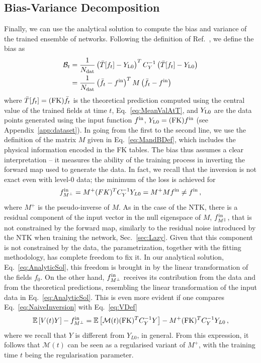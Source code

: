 \subsection{Bias-Variance Decomposition}
\label{sec:BiasVarNumerical}
Finally, we can use the analytical solution to compute the bias and variance of
the trained ensemble of networks. Following the definition of
Ref.~\cite{NNPDF:2021njg}, we define the bias as
\begin{align}
  \mathcal{B}_t 
  &= \frac{1}{N_{\rm dat}} \left( \bar{T}[f_t] - Y_{\rm L0} \right)^T C_Y^{-1} \left( \bar{T}[f_t] - Y_{\rm L0} \right) \\
  &= \frac{1}{N_{\rm dat}} \left( \bar{f_t} - f^{\rm in} \right)^T M \left( \bar{f_t} - f^{\rm in} \right)
  \label{eq:BiasDef}
\end{align}
where $\bar{T}[f_t] = (\mathrm{FK}) \bar{f}_t$ is the theoretical prediction computed
using the central value of the trained fields at time $t$,
Eq.~\eqref{eq:MeanValAtT}, and $Y_{\rm L0}$ are the data points generated using
the input function $f^{\rm in}$, $Y_{\rm L0}= (\mathrm{FK}) f^{\rm in}$ (see
Appendix~\ref{app:dataset}). In going from the first to the second line, we use
the definition of the matrix $M$ given in Eq.~\eqref{eq:MandBDef}, which includes
the physical information encoded in the FK tables. The bias thus assumes a
clear interpretation -- it measures the ability of the training process in
inverting the forward map used to generate the data. In fact, we recall that the
inversion is not exact even with level-0 data; the minimum of the loss is achieved for
\begin{equation}
  f^{\rm in}_{M^{\perp}} = M^{+} (FK)^T C_Y^{-1} Y_{L0} = M^{+} M f^{\rm in} \neq f^{\rm in} \,,
  \label{eq:NaiveInversion}
\end{equation}
where $M^{+}$ is the pseudo-inverse of $M$. As in the case of the NTK, there is
a residual component of the input vector in the null eigenspace of $M$,
$f^{\rm in}_{M^{\parallel}}$, that is not constrained by the forward map, similarly to
the residual noise introduced by the NTK when training the network,
Sec.~\ref{sec:Lazy}. Given that this component is not constrained by
the data, the parametrization, together with the fitting methodology, has
complete freedom to fix it. In our analytical solution,
Eq.~\eqref{eq:AnalyticSol}, this freedom is brought in by the linear
transformation of the fields $f_0$. On the other hand, $f^{\rm in}_{M^{\perp}}$
receives its contribution from the data and from the theoretical predictions,
resembling the linear transformation of the input data in
Eq.~\eqref{eq:AnalyticSol}. This is even more evident if one compares
Eq.~\eqref{eq:NaiveInversion} with Eq.~\eqref{eq:VDef}
\begin{equation}
  \mathbb{E} \left[ V(t) Y \right] - f^{\rm in}_{M^{\perp}}
    = \mathbb{E} \left[ \mathcal{M}(t) (\mathrm{FK})^T C_Y^{-1} Y \right] 
    - M^{+} (\mathrm{FK})^T C_Y^{-1} Y_{L0} \,,
\end{equation}
where we recall that $Y$ is different from $Y_{L0}$, in general. From this
expression, it follows that $\mathcal{M}(t)$ can be seen as a regularised
variant of $M^{+}$, with the training time $t$ being the regularisation
parameter.

